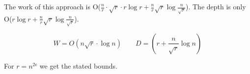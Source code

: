 The work of this approach is O($\frac nr \cdot \sqrt r \cdot r\log r + \frac nr\sqrt r \log \frac{n}{\sqrt r}$). The depth is only O($r\log r + \frac nr\sqrt r \log \frac{n}{\sqrt r}$).

\[W=O(n\sqrt r \cdot \log n) \qquad D=(r+\frac {n}{\sqrt r} \log n)\]

For $r=n^{2\epsilon}$ we get the stated bounds.
